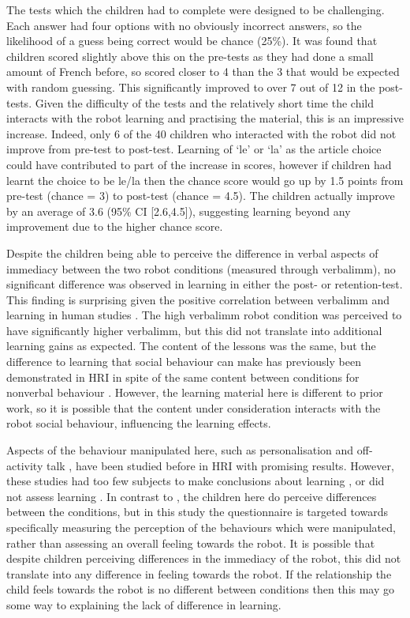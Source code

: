 The tests which the children had to complete were designed to be challenging. Each answer had four options with no obviously incorrect answers, so the likelihood of a guess being correct would be chance (25\%). It was found that children scored slightly above this on the pre-tests as they had done a small amount of French before, so scored closer to 4 than the 3 that would be expected with random guessing. This significantly improved to over 7 out of 12 in the post-tests. Given the difficulty of the tests and the relatively short time the child interacts with the robot learning and practising the material, this is an impressive increase. Indeed, only 6 of the 40 children who interacted with the robot did not improve from pre-test to post-test. Learning of `le' or `la' as the article choice could have contributed to part of the increase in scores, however if children had learnt the choice to be le/la then the chance score would go up by 1.5 points from pre-test (chance = 3) to post-test (chance = 4.5). The children actually improve by an average of 3.6 (95\% CI [2.6,4.5]), suggesting \gls{learning} beyond any improvement due to the higher chance score.

Despite the children being able to perceive the difference in verbal aspects of immediacy between the two robot conditions (measured through \gls{verbalimm}), no significant difference was observed in \gls{learning} in either the post- or retention-test. This finding is surprising given the positive correlation between \gls{verbalimm} and \gls{learning} in human studies \citep{gorham1988relationship,witt2004meta}. The high \gls{verbalimm} robot condition was perceived to have significantly higher \gls{verbalimm}, but this did not translate into additional \gls{learning} gains as expected. The content of the lessons was the same, but the difference to \gls{learning} that social behaviour can make has previously been demonstrated in HRI in spite of the same content between conditions for nonverbal behaviour \citep{kennedy2015higher,szafir2012pay}. However, the learning material here is different to prior work, so it is possible that the content under consideration interacts with the robot social behaviour, influencing the \gls{learning} effects.

Aspects of the behaviour manipulated here, such as personalisation \citep{henkemans2013using} and off-activity talk \citep{kruijff2014oat}, have been studied before in HRI with promising results. However, these studies had too few subjects to make conclusions about learning \citep{henkemans2013using}, or did not assess learning \citep{kruijff2014oat}. In contrast to \cite{kruijff2014oat}, the children here do perceive differences between the conditions, but in this study the questionnaire is targeted towards specifically measuring the perception of the behaviours which were manipulated, rather than assessing an overall feeling towards the robot. It is possible that despite children perceiving differences in the immediacy of the robot, this did not translate into any difference in feeling towards the robot. If the relationship the child feels towards the robot is no different between conditions then this may go some way to explaining the lack of difference in \gls{learning}.

